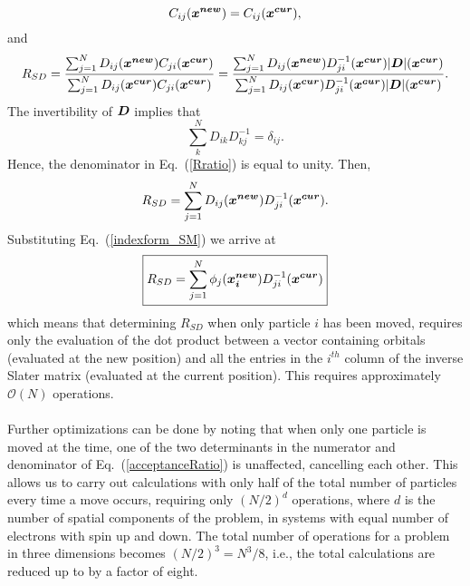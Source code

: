 $$C_{ij}(\boldsymbol{x^{new}}) = C_{ij}(\boldsymbol{x^{cur}}),$$
and 
\begin{equation}\label{Rratio}
R_{SD} = \frac{\sum_{j=1}^{N}D_{ij}(\boldsymbol{x^{new}}) C_{ji}(\boldsymbol{x^{cur}})}{\sum_{j=1}^{N}D_{ij}(\boldsymbol{x^{cur}}) C_{ji}(\boldsymbol{x^{cur}})} =  \frac{\sum_{j=1}^{N}D_{ij}(\boldsymbol{x^{new}}) D_{ji}^{-1}(\boldsymbol{x^{cur}}) {|\boldsymbol{D}|}(\boldsymbol{x^{cur}})}{\sum_{j=1}^{N}D_{ij}(\boldsymbol{x^{cur}}) D_{ji}^{-1}(\boldsymbol{x^{cur}}) {|\boldsymbol{D}|}(\boldsymbol{x^{cur}})}.\end{equation}
The invertibility of $\boldsymbol{D}$ implies that 
\begin{equation}\label{inverseSlaterMatrix}
 \sum_{k}^{N} D_{ik} D^{-1}_{kj} = \delta_{ij}.
\end{equation}
Hence, the denominator in Eq.~(\ref{Rratio}) is equal to unity. Then, $$
R_{SD} = \sum_{j=1}^{N}D_{ij}(\boldsymbol{x^{new}}) D_{ji}^{-1}(\boldsymbol{x^{cur}}).
$$
Substituting Eq.~(\ref{indexform_SM}) we arrive at
\begin{equation}\label{RSD}
 \boxed{R_{SD} = \sum_{j=1}^{N} \phi_j(\boldsymbol{x^{new}_i}) D_{ji}^{-1}(\boldsymbol{x^{cur}})}
\end{equation}
which means that determining $R_{SD}$ when only particle $i$ has been moved, requires only the evaluation of the dot product between a vector containing orbitals (evaluated at the new position) and all the entries in the $i^{th}$ column of the inverse Slater matrix (evaluated at the current position). This requires approximately $\mathcal{O}(N)$ operations.\\
\\
\noindent
Further optimizations can be done by noting that when only one particle is moved at the time, one of the two determinants in the numerator and denominator of 
Eq.~(\ref{acceptanceRatio}) is unaffected, cancelling each other. This allows us to 
carry out calculations with only half of the total number of particles every time a move occurs, requiring only $(N/2)^d$ o\-pe\-ra\-tions, where $d$ is the number of spatial components of the problem, in systems with equal number of electrons with spin up and down. The total number of operations for a problem in three dimensions becomes $(N/2)^3 = N^3/8$, i.e., the total calculations are reduced up to by a factor of eight.


